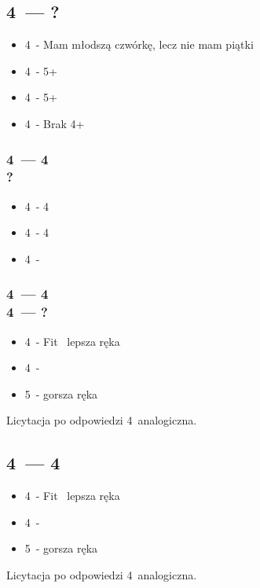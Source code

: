\documentclass[12pt, a4paper]{article}
\begin{document}
    \subsection{4\clubs\ --- ?}
    \begin{itemize}
        \item 4\diams\ - Mam młodszą czwórkę, lecz nie mam piątki
        \item 4\hearts\ - 5+\clubs
        \item 4\spades\ - 5+\diams 
        \item 4\nt\ - Brak 4+ \minor\
    \end{itemize}

    \subsubsection{4\clubs\ --- 4\diams \\ ?}
    \begin{itemize}
        \item 4\hearts\ - 4\clubs
        \item 4\spades\ - 4\diams
        \item 4\nt\ - \soff
    \end{itemize}

    \subsubsection{4\clubs\ --- 4\diams \\ 4\hearts\ --- ?}
    \begin{itemize}
        \item 4\spades\ - Fit \clubs\ lepsza ręka
        \item 4\nt\ - \soff
        \item 5\clubs\ - gorsza ręka
    \end{itemize}
    Licytacja po odpowiedzi 4\spades\ analogiczna.

    \subsection{4\clubs\ --- 4\hearts}
    \begin{itemize}
        \item 4\spades\ - Fit \clubs\ lepsza ręka
        \item 4\nt\ - \soff
        \item 5\clubs\ - gorsza ręka
    \end{itemize}
    Licytacja po odpowiedzi 4\spades\ analogiczna.
\end{document}
